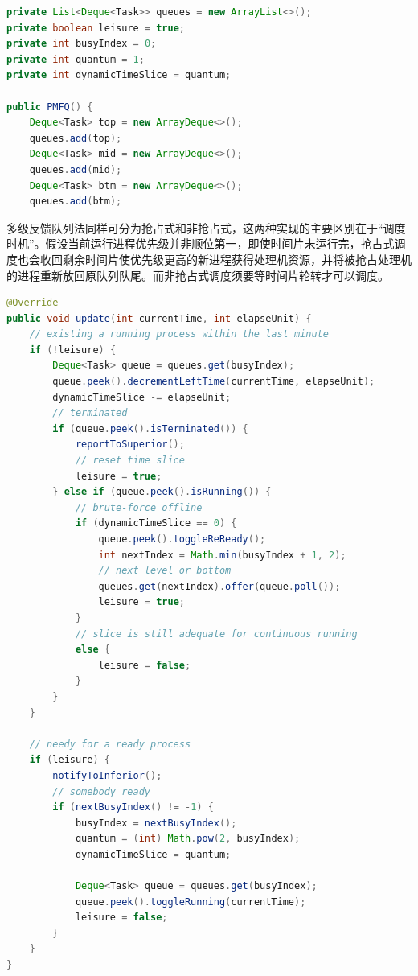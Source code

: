 \documentclass[UTF8]{ctexart}
\begin{document}
\begin{lstlisting}[language={java},caption={多级反馈队列（数据结构）}]
private List<Deque<Task>> queues = new ArrayList<>();
private boolean leisure = true;
private int busyIndex = 0;
private int quantum = 1;
private int dynamicTimeSlice = quantum;

public PMFQ() {
    Deque<Task> top = new ArrayDeque<>();
    queues.add(top);
    Deque<Task> mid = new ArrayDeque<>();
    queues.add(mid);
    Deque<Task> btm = new ArrayDeque<>();
    queues.add(btm);
\end{lstlisting}

多级反馈队列法同样可分为抢占式和非抢占式，这两种实现的主要区别在于“调度时机”。假设当前运行进程优先级并非顺位第一，即使时间片未运行完，抢占式调度也会收回剩余时间片使优先级更高的新进程获得处理机资源，并将被抢占处理机的进程重新放回原队列队尾。而非抢占式调度须要等时间片轮转才可以调度。
\begin{lstlisting}[language={java},caption={多级反馈队列（非抢占式调度）}]
@Override
public void update(int currentTime, int elapseUnit) {
    // existing a running process within the last minute
    if (!leisure) {
        Deque<Task> queue = queues.get(busyIndex);
        queue.peek().decrementLeftTime(currentTime, elapseUnit);
        dynamicTimeSlice -= elapseUnit;
        // terminated
        if (queue.peek().isTerminated()) {
            reportToSuperior();
            // reset time slice
            leisure = true;
        } else if (queue.peek().isRunning()) {
            // brute-force offline
            if (dynamicTimeSlice == 0) {
                queue.peek().toggleReReady();
                int nextIndex = Math.min(busyIndex + 1, 2);
                // next level or bottom
                queues.get(nextIndex).offer(queue.poll());
                leisure = true;
            }
            // slice is still adequate for continuous running
            else {
                leisure = false;
            }
        }
    }

    // needy for a ready process
    if (leisure) {
        notifyToInferior();
        // somebody ready
        if (nextBusyIndex() != -1) {
            busyIndex = nextBusyIndex();
            quantum = (int) Math.pow(2, busyIndex);
            dynamicTimeSlice = quantum;

            Deque<Task> queue = queues.get(busyIndex);
            queue.peek().toggleRunning(currentTime);
            leisure = false;
        }
    }
}
\end{lstlisting}
\end{document}
